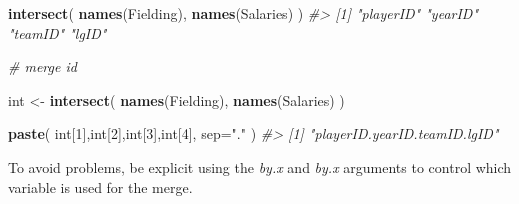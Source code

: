 \documentclass[]{book}
\newenvironment{Shaded}{\begin{snugshade}}{\end{snugshade}}
\newcommand{\CommentTok}[1]{\textcolor[rgb]{0.56,0.35,0.01}{\textit{#1}}}
\newcommand{\DataTypeTok}[1]{\textcolor[rgb]{0.13,0.29,0.53}{#1}}
\newcommand{\DecValTok}[1]{\textcolor[rgb]{0.00,0.00,0.81}{#1}}
\newcommand{\KeywordTok}[1]{\textcolor[rgb]{0.13,0.29,0.53}{\textbf{#1}}}
\newcommand{\NormalTok}[1]{#1}
\newcommand{\StringTok}[1]{\textcolor[rgb]{0.31,0.60,0.02}{#1}}
\theoremstyle{definition}
\theoremstyle{definition}
\theoremstyle{definition}
\theoremstyle{remark}
\begin{document}
\begin{Shaded}
\begin{Highlighting}[]


\KeywordTok{intersect}\NormalTok{( }\KeywordTok{names}\NormalTok{(Fielding), }\KeywordTok{names}\NormalTok{(Salaries) )}
\CommentTok{#> [1] "playerID" "yearID"   "teamID"   "lgID"}

\CommentTok{# merge id}

\NormalTok{int <-}\StringTok{ }\KeywordTok{intersect}\NormalTok{( }\KeywordTok{names}\NormalTok{(Fielding), }\KeywordTok{names}\NormalTok{(Salaries) )}

\KeywordTok{paste}\NormalTok{( int[}\DecValTok{1}\NormalTok{],int[}\DecValTok{2}\NormalTok{],int[}\DecValTok{3}\NormalTok{],int[}\DecValTok{4}\NormalTok{], }\DataTypeTok{sep=}\StringTok{"."}\NormalTok{ )}
\CommentTok{#> [1] "playerID.yearID.teamID.lgID"}
\end{Highlighting}
\end{Shaded}

To avoid problems, be explicit using the \emph{by.x} and \emph{by.x}
arguments to control which variable is used for the merge.
\end{document}
